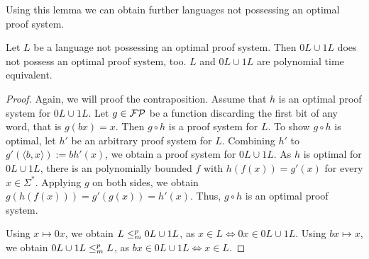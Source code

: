   Using this lemma we can obtain further languages not possessing an optimal proof system.

  \begin{lemma} \label{lemMitotic}
    Let \(L\) be a language not possessing an optimal proof system. Then \(0L \cup 1L\) does not possess an optimal proof system, too. \(L\) and \(0L \cup 1L\) are polynomial time equivalent.
  \end{lemma}

  \begin{proof}
    Again, we will proof the contraposition. Assume that \(h\) is an optimal proof system for \(0L \cup 1L\). Let \(g \in \mathcal{FP}\) be a function discarding the first bit of any word, that is \(g(bx) = x\). Then \(g \circ h\) is a proof system for \(L\). To show \(g \circ h\) is optimal, let \(h'\) be an arbitrary proof system for \(L\). Combining \(h'\) to \(g'(\langle b,x \rangle) := bh'(x)\), we obtain a proof system for \(0L \cup 1L\). As \(h\) is optimal for \(0L \cup 1L\), there is an polynomially bounded \(f\) with \(h(f(x)) = g'(x)\) for every \(x \in \Sigma^*\). Applying \(g\) on both sides, we obtain \(g(h(f(x))) = g'(g(x)) = h'(x)\). Thus, \(g \circ h\) is an optimal proof system.

    Using \(x \mapsto 0x\), we obtain \(L \leq_{m}^{p} 0L \cup 1L\), as \(x \in L \Leftrightarrow 0x \in 0L \cup 1L\). Using \(bx \mapsto x\), we obtain \(0L \cup 1L \leq_{m}^{p} L\), as \(bx \in 0L \cup 1L \Leftrightarrow x \in L\).
  \end{proof}





  





  